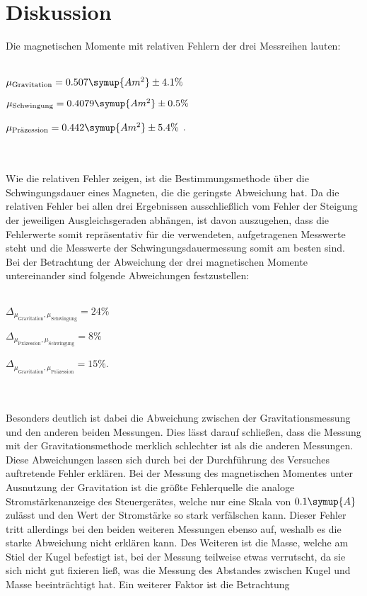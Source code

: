\section{Diskussion}
\label{sec:Diskussion}
Die magnetischen Momente mit relativen Fehlern der drei Messreihen lauten:
\\ \\
\centerline{$\mu_\text{Gravitation} = 0.507 \symup{A m^2} \pm 4.1\% $ }
\centerline{$\mu_\text{Schwingung} =  0.4079 \symup{A m^2} \pm 0.5\% $}
\centerline{$\mu_\text{Präzession} = 0.442  \symup{A m^2} \pm 5.4\%$ .}
\\ \\
Wie die relativen Fehler zeigen, ist die Bestimmungsmethode über die Schwingungsdauer eines Magneten, die die geringste 
Abweichung hat. Da die relativen Fehler bei allen drei Ergebnissen ausschließlich vom Fehler der Steigung der jeweiligen
Ausgleichsgeraden abhängen, ist davon auszugehen, dass die Fehlerwerte somit repräsentativ für die verwendeten, aufgetragenen
Messwerte steht und die Messwerte der Schwingungsdauermessung somit am besten sind. 
Bei der Betrachtung der Abweichung der drei magnetischen Momente untereinander sind folgende Abweichungen festzustellen:
\\ \\
\centerline{$\Delta_\text{$\mu_\text{Gravitation}, \mu_\text{Schwingung}$} = 24 \%$}
\centerline{$\Delta_\text{$\mu_\text{Präzession}, \mu_\text{Schwingung}$} = 8 \%$}
\centerline{$\Delta_\text{$\mu_\text{Gravitation}, \mu_\text{Präzession}$} = 15 \%$.}
\\ \\
Besonders deutlich ist dabei die Abweichung zwischen der Gravitationsmessung und den anderen beiden Messungen. Dies lässt
darauf schließen, dass die Messung mit der Gravitationsmethode merklich schlechter ist als die anderen Messungen.
Diese Abweichungen lassen sich durch bei der Durchführung des Versuches auftretende Fehler erklären.
Bei der Messung des magnetischen Momentes unter Ausnutzung der Gravitation ist die größte Fehlerquelle die analoge Stromstärkenanzeige
des Steuergerätes, welche nur eine Skala von $0.1 \symup{A}$ zulässt und den Wert der Stromstärke so stark verfälschen kann.
Dieser Fehler tritt allerdings bei den beiden weiteren Messungen ebenso auf, weshalb es die starke Abweichung nicht erklären kann.
Des Weiteren ist die Masse, welche am Stiel der Kugel befestigt ist, bei der Messung teilweise etwas verrutscht, da sie sich nicht
gut fixieren ließ, was die Messung des Abstandes zwischen Kugel und Masse beeinträchtigt hat. Ein weiterer Faktor ist die Betrachtung
